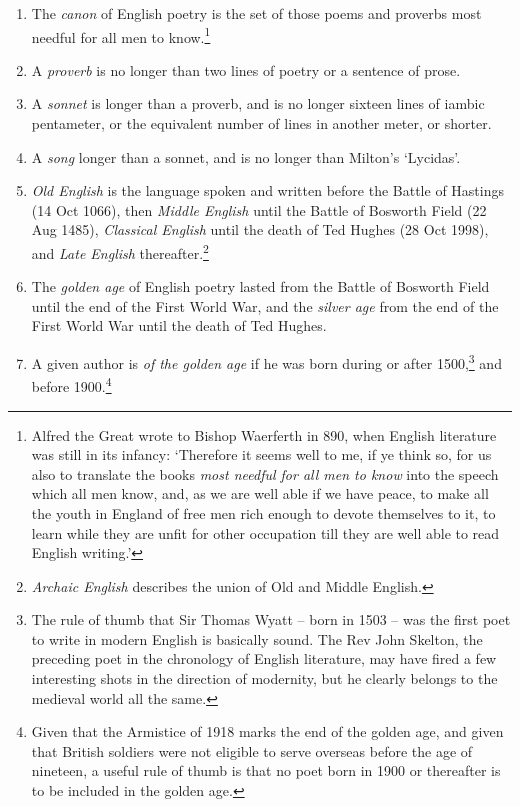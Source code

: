 \begin{enumerate}[leftmargin=*, resume]
    \item{The \emph{canon} of English poetry is the set of those poems and proverbs most needful for all men to know.\footnote{Alfred the Great wrote to Bishop Waerferth in 890, when English literature was still in its infancy: `Therefore it seems well to me, if ye think so, for us also to translate the books \emph{most needful for all men to know} into the speech which all men know, and, as we are well able if we have peace, to make all the youth in England of free men rich enough to devote themselves to it, to learn while they are unfit for other occupation till they are well able to read English writing.'}}
    \item{A \emph{proverb} is no longer than two lines of poetry or a sentence of prose.}
    \item{A \emph{sonnet} is longer than a proverb, and is no longer sixteen lines of iambic pentameter, or the equivalent number of lines in another meter, or shorter.}
    \item{A \emph{song} longer than a sonnet, and is no longer than Milton's `Lycidas'.}
    \item{\textit{Old English} is the language spoken and written before the Battle of Hastings (14 Oct 1066), then \emph{Middle English} until the Battle of Bosworth Field (22 Aug 1485), \emph{Classical English} until the death of Ted Hughes (28 Oct 1998), and \emph{Late English} thereafter.\footnote{\emph{Archaic English} describes the union of Old and Middle English.}}
    \item{The \emph{golden age} of English poetry lasted from the Battle of Bosworth Field until the end of the First World War, and the \emph{silver age} from the end of the First World War until the death of Ted Hughes.}
    \item{A given author is \emph{of the golden age} if he was born during or after 1500,\footnote{The rule of thumb that Sir Thomas Wyatt -- born in 1503 -- was the first poet to write in modern English is basically sound. The Rev John Skelton, the preceding poet in the chronology of English literature, may have fired a few interesting shots in the direction of modernity, but he clearly belongs to the medieval world all the same.} and before 1900.\footnote{Given that the Armistice of 1918 marks the end of the golden age, and given that British soldiers were not eligible to serve overseas before the age of nineteen, a useful rule of thumb is that no poet born in 1900 or thereafter is to be included in the golden age.}}

\end{enumerate}

